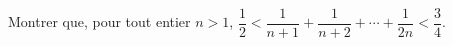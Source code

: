 Montrer que, pour tout entier $n > 1$, $\dfrac{1}{2} < \dfrac{1}{n + 1} + \dfrac{1}{n + 2} + \cdots + \dfrac{1}{2n} < \dfrac{3}{4}$.
